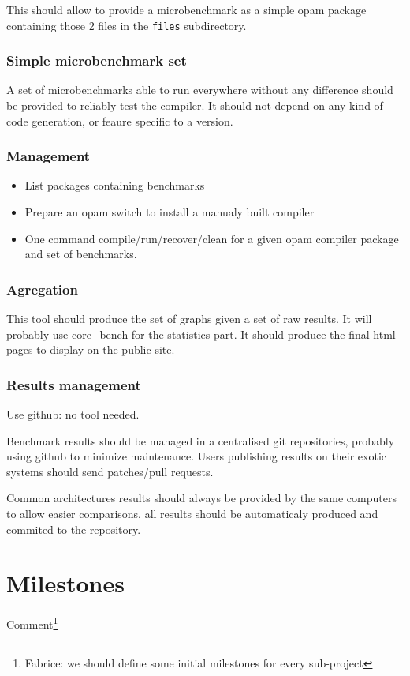 \documentclass[11pt,a4paper]{article}
\begin{document}
This should allow to provide a microbenchmark as a simple opam package
containing those 2 files in the \texttt{files} subdirectory.

\subsubsection{Simple microbenchmark set}

A set of microbenchmarks able to run everywhere without any difference
should be provided to reliably test the compiler. It should not depend
on any kind of code generation, or feaure specific to a version.

\subsubsection{Management}

\begin{itemize}
\item List packages containing benchmarks
\item Prepare an opam switch to install a manualy built compiler
\item One command compile/run/recover/clean for a given opam compiler
  package and set of benchmarks.
\end{itemize}

\subsubsection{Agregation}

This tool should produce the set of graphs given a set of raw
results. It will probably use core\_bench for the statistics part. It
should produce the final html pages to display on the public site.

\subsubsection{Results management}

Use github: no tool needed.

Benchmark results should be managed in a centralised git repositories,
probably using github to minimize maintenance. Users publishing
results on their exotic systems should send patches/pull requests.

Common architectures results should always be provided by the same
computers to allow easier comparisons, all results should be
automaticaly produced and commited to the repository.

\section{Milestones}

Comment\footnote{Fabrice: we should define some initial milestones for
  every sub-project}
\end{document}
